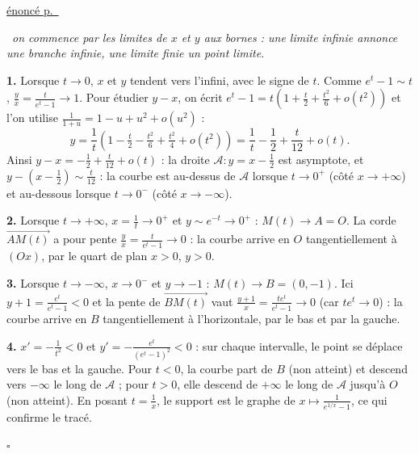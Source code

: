 \documentclass[a4paper,11pt]{article}
\numberwithin{equation}{section}
\numberwithin{figure}{section}
\numberwithin{table}{section}
\theoremstyle{enonce}
\theoremstyle{exemple}
\theoremstyle{remarque}
\newenvironment{corrige}[1]{%
  \par\needspace{6\baselineskip}\vspace{1em}\phantomsection\label{c:#1}%
  \noindent{\sffamily\bfseries\color{Bleu}Exercice~\ref{e:#1}}\quad
  {\scriptsize\sffamily\hyperref[e:#1]{\color{Gris}énoncé p.~\pageref{e:#1}}}\par\nobreak\vspace{0.2em}}%
  {\hfill\textcolor{BleuClair}{$\square$}\par}
\newcommand{\vv}[1]{\overrightarrow{#1}}
\newcommand{\demarche}[1]{\noindent{\sffamily\bfseries\small\color{BleuMoyen}Démarche.}\ \textit{#1}\par\smallskip}
\begin{document}
\begin{corrige}{br-c}
\demarche{on commence par les limites de $x$ et $y$ aux bornes : une limite infinie annonce une branche infinie, une limite finie un point limite.}
\textbf{1.} Lorsque $t\to0$, $x$ et $y$ tendent vers l'infini, avec le signe de $t$. Comme $e^t-1\sim t$,
$\frac yx=\frac t{e^t-1}\to1$. Pour étudier $y-x$, on écrit $e^t-1=t\left(1+\frac t2+\frac{t^2}6+o(t^2)\right)$ et l'on
utilise $\frac1{1+u}=1-u+u^2+o(u^2)$ :
\[y=\frac1t\left(1-\tfrac t2-\tfrac{t^2}6+\tfrac{t^2}4+o(t^2)\right)=\frac1t-\frac12+\frac t{12}+o(t).\]
Ainsi $y-x=-\frac12+\frac{t}{12}+o(t)$ : la droite $\mathcal A:y=x-\frac12$ est asymptote, et
$y-\left(x-\frac12\right)\sim\frac t{12}$ : la courbe est au-dessus de $\mathcal A$ lorsque $t\to0^+$ (côté
$x\to+\infty$) et au-dessous lorsque $t\to0^-$ (côté $x\to-\infty$).

\textbf{2.} Lorsque $t\to+\infty$, $x=\frac1t\to0^+$ et $y\sim e^{-t}\to0^+$ : $M(t)\to A=O$. La corde $\vv{AM(t)}$ a pour
pente $\frac yx=\frac t{e^t-1}\to0$ : la courbe arrive en $O$ tangentiellement à $(Ox)$, par le quart de plan $x>0$, $y>0$.

\textbf{3.} Lorsque $t\to-\infty$, $x\to0^-$ et $y\to-1$ : $M(t)\to B=(0,-1)$. Ici $y+1=\frac{e^t}{e^t-1}<0$ et la pente de
$\vv{BM(t)}$ vaut $\frac{y+1}x=\frac{te^t}{e^t-1}\to0$ (car $te^t\to0$) : la courbe arrive en $B$ tangentiellement à
l'horizontale, par le bas et par la gauche.

\textbf{4.} $x'=-\frac1{t^2}<0$ et $y'=-\frac{e^t}{(e^t-1)^2}<0$ : sur chaque intervalle, le point se déplace vers le bas et
la gauche. Pour $t<0$, la courbe part de $B$ (non atteint) et descend vers $-\infty$ le long de $\mathcal A$ ; pour $t>0$, elle
descend de $+\infty$ le long de $\mathcal A$ jusqu'à $O$ (non atteint). En posant $t=\frac1x$, le support est le graphe de
$x\mapsto\frac1{e^{1/x}-1}$, ce qui confirme le tracé.
\begin{center}
\end{center}
\end{corrige}
\end{document}
